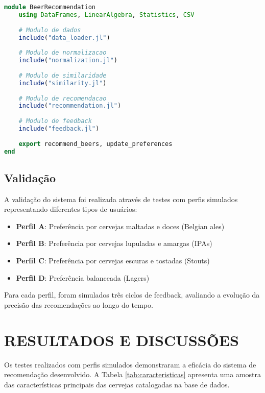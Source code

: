 \documentclass[12pt,a4paper]{article}
\begin{document}
\begin{lstlisting}[language=Julia, caption=Estrutura modular do código Julia]
module BeerRecommendation
    using DataFrames, LinearAlgebra, Statistics, CSV
    
    # Modulo de dados
    include("data_loader.jl")
    
    # Modulo de normalizacao
    include("normalization.jl")
    
    # Modulo de similaridade
    include("similarity.jl")
    
    # Modulo de recomendacao
    include("recommendation.jl")
    
    # Modulo de feedback
    include("feedback.jl")
    
    export recommend_beers, update_preferences
end
\end{lstlisting}

\subsection{Validação}

A validação do sistema foi realizada através de testes com perfis simulados representando diferentes tipos de usuários:

\begin{itemize}
\item \textbf{Perfil A}: Preferência por cervejas maltadas e doces (Belgian ales)
\item \textbf{Perfil B}: Preferência por cervejas lupuladas e amargas (IPAs)
\item \textbf{Perfil C}: Preferência por cervejas escuras e tostadas (Stouts)
\item \textbf{Perfil D}: Preferência balanceada (Lagers)
\end{itemize}

Para cada perfil, foram simulados três ciclos de feedback, avaliando a evolução da precisão das recomendações ao longo do tempo.

\newpage
\section{RESULTADOS E DISCUSSÕES}

Os testes realizados com perfis simulados demonstraram a eficácia do sistema de recomendação desenvolvido. A Tabela \ref{tab:caracteristicas} apresenta uma amostra das características principais das cervejas catalogadas na base de dados.
\end{document}
